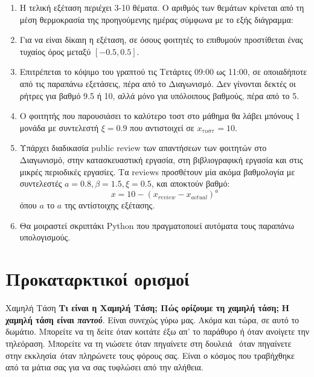 \documentclass[11pt,a4paper,notitlepage,fleqn]{article}
\begin{document}
\begin{enumerate}
    \item Η τελική εξέταση περιέχει 3-10 θέματα. Ο αριθμός των θεμάτων κρίνεται από τη μέση θερμοκρασία της προηγούμενης ημέρας σύμφωνα με το εξής διάγραμμα:

\begin{center}
    \end{center}

\item Για να είναι δίκαιη η εξέταση, σε όσους φοιτητές το επιθυμούν προστίθεται ένας τυχαίος όρος μεταξύ \( [-0.5,0.5]\).

\item Επιτρέπεται το κόψιμο του γραπτού τις Τετάρτες 09:00 ως 11:00, σε οποιαδήποτε από τις παραπάνω εξετάσεις, πέρα από το Διαγωνισμό. Δεν γίνονται δεκτές οι ρήτρες για βαθμό 9.5 ή 10, αλλά μόνο για υπόλοιπους βαθμούς, πέρα από το 5.

\item Ο φοιτητής που παρουσιάσει το καλύτερο τοστ στο μάθημα θα λάβει μπόνους 1 μονάδα με συντελεστή \( ξ = 0.9\) που αντιστοιχεί σε \( x_{\text{τοστ}} = 10\).

\item Υπάρχει διαδικασία public review των απαντήσεων των φοιτητών στο Διαγωνισμό, στην κατασκευαστική εργασία, στη βιβλιογραφική εργασία και στις μικρές περιοδικές εργασίες. Τα reviews προσθέτουν μία ακόμα βαθμολογία με συντελεστές \(a = 0.8, β=1.5, ξ = 0.5\), και αποκτούν βαθμό:
\[
x = 10 - \left(x_{review} - x_{actual}\right)^a
\]
όπου \(a \) το \(a\) της αντίστοιχης εξέτασης.

\item Θα μοιραστεί σκριπτάκι Python που πραγματοποιεί αυτόματα τους παραπάνω υπολογισμούς.
\end{enumerate}



\section{Προκαταρκτικοί ορισμοί}

\begin{defn}{Χαμηλή Τάση}{}
	\textbf{Τι είναι η Χαμηλή Τάση; Πώς ορίζουμε τη χαμηλή τάση;} \textbf{Η χαμηλή τάση είναι \textit{παντού}}. Είναι συνεχώς γύρω μας. Ακόμα και τώρα, σε αυτό το δωμάτιο. Μπορείτε να τη δείτε όταν κοιτάτε έξω απ' το παράθυρο ή όταν ανοίγετε την τηλεόραση. Μπορείτε να τη νιώσετε όταν πηγαίνετε στη δουλειά\textellipsis~ όταν πηγαίνετε στην εκκλησία\textellipsis~όταν πληρώνετε τους φόρους σας. Είναι ο κόσμος που τραβήχθηκε από τα μάτια σας για να σας τυφλώσει από την αλήθεια.
\end{defn}
\end{document}
